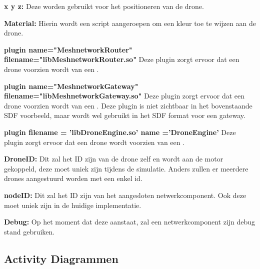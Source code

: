 \documentclass[a4paper, 11pt, oneside]{report}
\begin{document}
\textbf{x y z: } Deze worden gebruikt voor het positioneren van de drone.

\textbf{Material:} Hierin wordt een script aangeroepen om een kleur toe te wijzen aan de drone.

\textbf{plugin name="MeshnetworkRouter" filename="libMeshnetworkRouter.so"} Deze plugin zorgt ervoor dat een drone voorzien wordt van een .

\textbf{plugin name="MeshnetworkGateway" filename="libMeshnetworkGateway.so"} Deze plugin zorgt ervoor dat een drone voorzien wordt van een . Deze plugin is niet zichtbaar in het bovenstaande SDF voorbeeld, maar wordt wel gebruikt in het SDF format voor een gateway. 

\textbf{plugin filename = 'libDroneEngine.so' name ='DroneEngine'} Deze plugin zorgt ervoor dat een drone wordt voorzien van een .


\textbf{DroneID:} Dit zal het ID zijn van de drone zelf en wordt aan de motor gekoppeld, deze moet uniek zijn tijdens de simulatie. Anders zullen er meerdere drones aangestuurd worden met een enkel id.

\textbf{nodeID:} Dit zal het ID zijn van het aangesloten netwerkcomponent. Ook deze moet uniek zijn in de huidige implementatie. 

\textbf{Debug:} Op het moment dat deze aanstaat, zal een netwerkcomponent zijn debug stand gebruiken.



\subsection{Activity Diagrammen}
\label{DetailedDesign:MeshNetwerk:activity}
\end{document}
